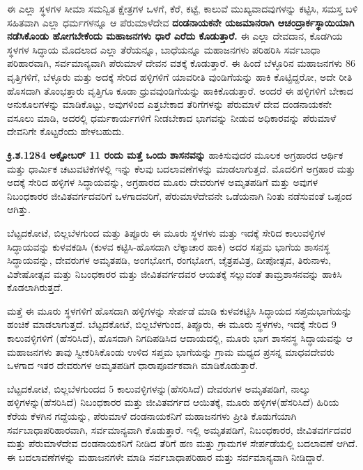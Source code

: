 ಈ ಎಲ್ಲಾ ಸ್ಥಳಗಳ ಸೀಮಾ ಸಮನ್ವಿತ ಕ್ಷೇತ್ರಗಳ ಒಳಗೆ, ಕೆರೆ, ಕಟ್ಟೆ, ಕಾಲುವೆ ಮುಖ್ಯವಾದವುಗಳನ್ನು ಕಟ್ಟಿಸಿ, ಸಮಸ್ತ ಬಳಿ ಸಹಿತವಾಗಿ ಎಲ್ಲಾ ಧರ್ಮಗಳನ್ನೂ ಆ ಪೆರುಮಾಳೆದೇವ \textbf{ದಂಡನಾಯಕನೇ ಯಜಮಾನರಾಗಿ ಆಚಂದ್ರಾರ್ಕಸ್ಥಾಯಿಯಾಗಿ ನಡೆಸಿಕೊಂಡು ಹೋಗಬೇಕೆಂದು ಮಹಾಜನಗಳು ಧಾರೆ ಎರೆದು ಕೊಡುತ್ತಾರೆ.} ಈ ಎಲ್ಲಾ ದೇವದಾನ, ಕೊಡಗಿಯ ಸ್ಥಳಗಳ ಸಿದ್ಧಾಯ ಮೊದಲಾದ ಎಲ್ಲಾ ತೆರೆಯನ್ನೂ, ಬಾಧೆಯನ್ನೂ ಮಹಾಜನಗಳು ಪರಿಹರಿಸಿ ಸರ್ವಬಾಧಾ ಪರಿಹಾರವಾಗಿ, ಸರ್ವಮಾನ್ಯವಾಗಿ ಪೆರುಮಾಳೆ ದೇವನ ವಶಕ್ಕೆ ಕೊಡುತ್ತಾರೆ. ಈ ಹಿಂದೆ ಬೆಳ್ಳೂರಿನ ಮಹಾಜನಗಳು 86 ವೃತ್ತಿಗಳಿಗೆ, ಬೆಳ್ಳೂರು ಮತ್ತು ಅದಕ್ಕೆ ಸೇರಿದ ಹಳ್ಳಿಗಳಿಗೆ ಯಾವರೀತಿ ವುಂಡಿಗೆಯನ್ನು ಹಾಕಿ ಕೊಟ್ಟಿದ್ದರೋ, ಅದೇ ರೀತಿ ಹೊಸದಾಗಿ ತೊಂಭತ್ತಾರು ವೃತ್ತಿಗೂ ಕೂಡಾ ಧ್ರುವವುಂಡಿಗೆಯನ್ನು ಹಾಕಿಕೊಡುತ್ತಾರೆ. ಅಂದರೆ ಈ ಹಳ್ಳಿಗಳಿಗೆ ಬೇಕಾದ ಅನುಕೂಲಗಳನ್ನು ಮಾಡಿಕೊಟ್ಟು, ಅವುಗಳಿಂದ ಎತ್ತಬೇಕಾದ ತೆರಿಗೆಗಳನ್ನು ಪೆರುಮಾಳೆ ದೇವ ದಂಡನಾಯಕನೇ ವಸೂಲು ಮಾಡಿ, ಅದರಲ್ಲಿ ಧರ್ಮಕಾರ್ಯಗಳಿಗೆ ನೀಡಬೇಕಾದ ಭಾಗವನ್ನು ನೀಡುವ ಅಧಿಕಾರವನ್ನು ಪೆರುಮಾಳೆ ದೇವನಿಗೇ ಕೊಟ್ಟರೆಂದು ಹೇಳಬಹುದು.

\textbf{ಕ್ರಿ.ಶ.1284 ಅಕ್ಟೋಬರ್​ 11 ರಂದು ಮತ್ತೆ ಒಂದು ಶಾಸನವನ್ನು} ಹಾಕಿಸುವುದರ ಮೂಲಕ ಅಗ್ರಹಾರದ ಆರ್ಥಿಕ ಮತ್ತು ಧಾರ್ಮಿಕ ಚಟುವಟಿಕೆಗಳಲ್ಲಿ ಇನ್ನು ಕೆಲವು ಬದಲಾವಣೆಗಳನ್ನು ಮಾಡಲಾಗುತ್ತದೆ. ಮೊದಲಿಗೆ ಅಗ್ರಹಾರ ಮತ್ತು ಅದಕ್ಕೆ ಸೇರಿದ ಹಳ್ಳಿಗಳ ಸಿದ್ಧಾಯವನ್ನು, ಅಗ್ರಹಾರದ ಮೂರು ದೇವರುಗಳ ಅಮೃತಪಡಿಗೆ ಮತ್ತು ಅವುಗಳ ನಿಬಂಧಕಾರರ ಜೀವಿತವರ್ಗದವರಿಗೆ ಒಳಗಾದವರಿಗೆ, ಪೆರುಮಾಳೆದೇವನೇ ಒಡೆಯನಾಗಿ ನಿಂತು ನಡೆಸುವಂತೆ ಒಪ್ಪಂದ ಆಗಿತ್ತು.

ಬೆಟ್ಟದಕೋಟೆ, ಬಿಲ್ಲಬೆಳಗುಂದ ಮತ್ತು ತಿಪ್ಪೂರು ಈ ಮೂರು ಸ್ಥಳಗಳು ಮತ್ತು ಇದಕ್ಕೆ ಸೇರಿದ ಕಾಲುವಳ್ಳಿಗಳ ಸಿದ್ಧಾಯವನ್ನು ಕುಳವಕಡಿಸಿ (ಕುಳವ ಕಟ್ಟಿಸಿ-ಹೊಸದಾಗಿ ಲೆಕ್ಕಾಚಾರ ಹಾಕಿ) ಅದರ ಸಪ್ತಮ ಭಾಗೆಯ ಶಾಸನಸ್ಥ ಸಿದ್ಧಾಯವನ್ನು, ದೇವರುಗಳ ಅಮೃತಪಡಿ, ಅಂಗಭೋಗ, ರಂಗಭೋಗ, ಚೈತ್ರಪವಿತ್ರ, ದೀಪೋತ್ಸವ, ತಿರುನಾಳು, ವಿಶೇಷೋತ್ಸವ ಮತ್ತು ನಿಬಂಧಕಾರರ ಮತ್ತು ಜೀವಿತವರ್ಗದವರ ಆಯತಕ್ಕೆ ಸಲ್ಲುವಂತೆ ತಾಮ್ರಶಾಸನವನ್ನು ಹಾಕಿಸಿ ಕೊಡಲಾಗಿರುತ್ತದೆ.

ಮತ್ತೆ ಈ ಮೂರು ಸ್ಥಳಗಳಿಗೆ ಹೊಸದಾಗಿ ಹಳ್ಳಿಗಳನ್ನು ಸೇರ್ಪಡೆ ಮಾಡಿ ಕುಳವಕಟ್ಟಿಸಿ ಸಿದ್ಧಾಯದ ಸಪ್ತಮ\break ಭಾಗೆಯನ್ನು ಹಂಚಿಕೆ ಮಾಡಲಾಗುತ್ತದೆ. ಬೆಟ್ಟದಕೋಟೆ, ಬಿಲ್ಲಬೆಳಗುಂದ, ತಿಪ್ಪೂರು, ಈ ಮೂರು ಸ್ಥಳಗಳು, ಇದಕ್ಕೆ ಸೇರಿದ 9 ಕಾಲುವಳ್ಳಿಗಳಿಗೆ (ಹೆಸರಿಸಿದೆ), ಹೊಸದಾಗಿ ನಿಗದಿಪಡಿಸಿದ ಆದಾಯದಲ್ಲಿ, ಮೂರು ಭಾಗ ಶಾಸನಸ್ಥ ಸಿದ್ಧಾಯವನ್ನು ಆ ಮಹಾಜನಗಳು ತಾವು ಸ್ವೀಕರಿಸಿಕೊಂಡು ಉಳಿದ ಸಪ್ತಮ ಭಾಗೆಯನ್ನು ಗ್ರಾಮ ಮಧ್ಯದ ಪ್ರಸನ್ನ ಮಾಧವದೇವರು ಒಳಗಾದ ಇತರ ದೇವರುಗಳ ಅಮೃತಪಡಿಗೆ ಧಾರಾಪೂರ್ವಕವಾಗಿ ಮಾಡಿಕೊಡುತ್ತಾರೆ.

ಬೆಟ್ಟದಕೋಟೆ, ಬಿಲ್ಲಬೆಳಗುಂದದ 5 ಕಾಲುವಳ್ಳಿಗಳನ್ನು(ಹೆಸರಿಸಿದೆ) ದೇವರುಗಳ ಅಮೃತಪಡಿಗೆ, ನಾಲ್ಕು ಹಳ್ಳಿಗಳನ್ನು\break (ಹೆಸರಿಸಿದೆ) ನಿಬಂಧಕಾರರ ಮತ್ತು ಜೀವಿತವರ್ಗದ ಆಯಿತಕ್ಕೆ, ಮೂರು ಹಳ್ಳಿಗಳ(ಹೆಸರಿಸಿದೆ) ಹಿರಿಯ ಕೆರೆಯ ಕೆಳಗಿನ ಗದ್ದೆಯನ್ನು, ಪೆರುಮಾಳೆ ದಂಡನಾಯಕನಿಗೆ ಮಹಾಜನಗಳು ಪ್ರೀತಿ ಕೊಡುಗೆಯಾಗಿ ಸರ್ವಬಾಧಾಪರಿಹಾರವಾಗಿ, ಸರ್ವ\-ಮಾನ್ಯವಾಗಿ ಕೊಡುತ್ತಾರೆ. ಇಲ್ಲಿ ಅಮೃತಪಡಿಗೆ, ನಿಬಂಧಕಾರರ, ಜೀವಿತವರ್ಗದವರ ಮತ್ತು ಪೆರುಮಾಳೆದೇವ ದಂಡನಾಯಕನಿಗೆ ನೀಡಿದ ತೆರಿಗೆ ಹಣ ಮತ್ತು ಗ್ರಾಮಗಳ ಸೇರ್ಪಡೆಯಲ್ಲಿ ಬದಲಾವಣೆ ಆಗಿದೆ. ಈ ಬದಲಾವಣೆಗಳನ್ನು ಮಹಾಜನಗಳೇ ಮಾಡಿ ಸರ್ವಬಾಧಾಪರಿಹಾರ ಮತ್ತು ಸರ್ವಮಾನ್ಯವಾಗಿ ನೀಡಿದ್ದಾರೆ.

